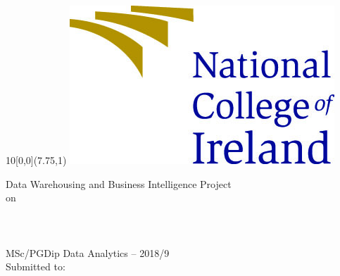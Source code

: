 
\newcommand{\diameter}{20}
\newcommand{\xone}{-15}
\newcommand{\xtwo}{160}
\newcommand{\yone}{15}
\newcommand{\ytwo}{-253}
\newcommand{\myinstitute}{School of Computing \\ National College of Ireland}

\begin{titlepage}
	\begin{textblock}{10}[0,0](7.75,1)
		\includegraphics[width=.3\textwidth, center]{logos/NCI_Logo_colour.jpg}
	\end{textblock}	
	\vspace*{5.5cm}
	\begin{center}
		\Huge{Data Warehousing and Business Intelligence Project}\\
		\vspace*{1cm}
		\small{on}\\
		\vspace*{1cm}
		\Large{
			\mytopic
		}\\
		\vspace*{2cm}
		\huge{\myname}\\
		\Large{\SID}\\
		
		\vspace*{4.5cm}
		\large{MSc/PGDip Data Analytics -- 2018/9}\\
		\vspace*{2cm}
		\large{Submitted to: \lecturer}
	\end{center}

\end{titlepage}
